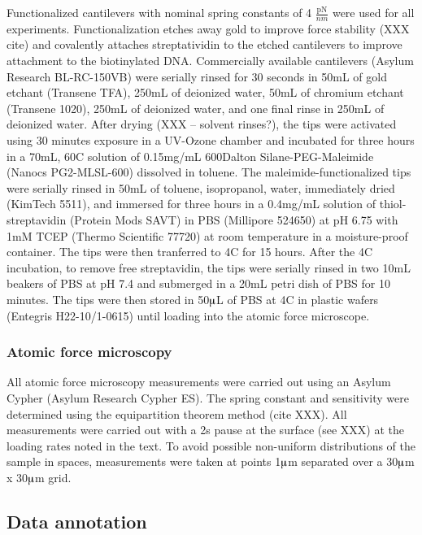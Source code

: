 \documentclass[%
  aip,12pt,tightenlines,
  amsthm,
 amsmath,amssymb
]{article}
\newcommand{\sLabel}[1]{\label{section:#1}}
\newcommand{\firstp}[0]{}
\newcommand{\pl}[0]{\vspace{6pt}}
\newcommand{\supply}[2]{(#1 #2)}
\newcommand{\degreeC}[0]{\degree{}C}
\begin{document}
\firstp Functionalized cantilevers with nominal spring constants of 4 $\frac{\text{pN}}{nm}$  were used for all experiments. Functionalization etches away gold to improve force stability (XXX cite) and covalently attaches streptatividin to the etched cantilevers to improve attachment to the biotinylated DNA. Commercially available cantilevers \supply{Asylum Research}{BL-RC-150VB} were serially rinsed for 30 seconds in 50mL of gold etchant \supply{Transene}{TFA}, 250mL of deionized water, 50mL of chromium etchant \supply{Transene}{1020}, 250mL of deionized water, and one final rinse in 250mL of deionized water. After drying (XXX -- solvent rinses?), the tips were activated using 30 minutes exposure in a UV-Ozone chamber and incubated for three hours in a 70mL, 60\degreeC{} solution of 0.15mg/mL 600Dalton Silane-PEG-Maleimide \supply{Nanocs}{PG2-MLSL-600} dissolved in toluene. The maleimide-functionalized tips were serially rinsed in 50mL of toluene, isopropanol, water, immediately dried \supply{KimTech}{5511}, and immersed for three hours in a 0.4mg/mL solution of thiol-streptavidin \supply{Protein Mods}{SAVT} in PBS \supply{Millipore}{524650} at pH 6.75 with 1mM TCEP \supply{Thermo Scientific}{77720} at room temperature in a moisture-proof container. The tips were then tranferred to 4\degreeC{} for 15 hours. After the 4\degreeC{} incubation, to remove free streptavidin, the tips were serially rinsed in two 10mL beakers of PBS at pH 7.4 and submerged in a 20mL petri dish of PBS for 10 minutes. The tips were then stored in 50$\muup$L of PBS at 4C in plastic wafers \supply{Entegris}{H22-10/1-0615} until loading into the atomic force microscope. \pl

\subsubsection{\sLabel{Surface}Atomic force microscopy}

All atomic force microscopy measurements were carried out using an Asylum Cypher \supply{Asylum Research}{Cypher ES}. The spring constant and sensitivity were determined using the equipartition theorem method (cite XXX). All measurements were carried out with a 2s pause at the surface (see XXX) at the loading rates noted in the text. To avoid possible non-uniform distributions of the sample in spaces, measurements were taken at points 1$\muup$m separated over a 30$\muup$m x 30$\muup$m grid. 

\subsection{\sLabel{Annotation}Data annotation}
\end{document}
